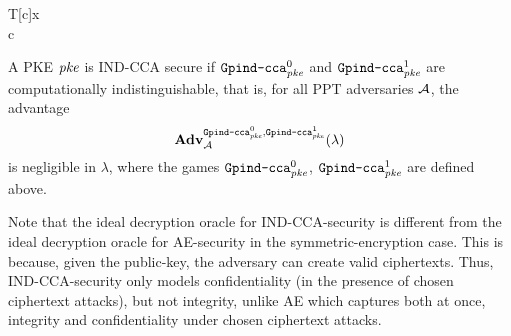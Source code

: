 \begin{security}
\begin{codebox}
\begin{center}
\begin{pchstack}
\begin{pcvstack}
{			T[c]\gets x\\
			\pcreturn c}
			\pcvspace
		\end{pcvstack}
	\end{pchstack}
\end{center}
\end{codebox}
\vspace{5mm}
 A PKE $\mathit{{pke}}$ is IND-CCA secure if $\text{\texttt{Gpind\text{-}cca}}^0_{\mathit{{pke}}}$ and $\text{\texttt{Gpind\text{-}cca}}^1_{\mathit{{pke}}}$ are computationally indistinguishable, that is, for all PPT adversaries $\mathcal{A}$, the advantage
 \[\mathbf{Adv}_{\mathcal{A}}^{
	\text{\texttt{Gpind\text{-}cca}}^0_{\mathit{{pke}}}
	 ,\text{\texttt{Gpind\text{-}cca}}^1_{\mathit{{pke}}}}
	 (\lambda) \]
 is negligible in $\lambda$, where the games $\text{\texttt{Gpind\text{-}cca}}^0_{\mathit{{pke}}}$, $\text{\texttt{Gpind\text{-}cca}}^1_{\mathit{{pke}}}$ are defined above.
\end{security}



\begin{remark}
    Note that the ideal decryption oracle for IND-CCA-security is different from the ideal decryption oracle for AE-security in the symmetric-encryption case. This is because, given the public-key, the adversary can create valid ciphertexts. Thus, IND-CCA-security only models confidentiality (in the presence of chosen ciphertext attacks), but not integrity, unlike AE which captures both at once, integrity and confidentiality under chosen ciphertext attacks.
\end{remark}
